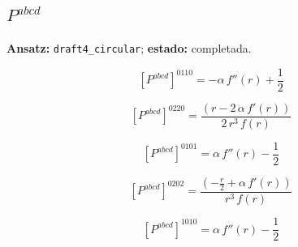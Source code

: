 \documentclass[11pt]{article}
\begin{document}
\subsection*{$ P^{abcd} $}
\textbf{Ansatz:} \texttt{draft4\_circular}; \textbf{estado:} completada.\par
\begin{dmath*}[breakdepth={5}]
\left[P^{abcd}\right]^{0110} = -\alpha\,f''\!\left(r\right) + \frac{1}{2}
\end{dmath*}
\par\smallskip
\begin{dmath*}[breakdepth={5}]
\left[P^{abcd}\right]^{0220} = \frac{\left(r - 2\,\alpha\,f'\!\left(r\right)\right)}{2\,{r}^{3}\,f\!\left(r\right)}
\end{dmath*}
\par\smallskip
\begin{dmath*}[breakdepth={5}]
\left[P^{abcd}\right]^{0101} = \alpha\,f''\!\left(r\right) - \frac{1}{2}
\end{dmath*}
\par\smallskip
\begin{dmath*}[breakdepth={5}]
\left[P^{abcd}\right]^{0202} = \frac{\left(-\frac{r}{2} + \alpha\,f'\!\left(r\right)\right)}{{r}^{3}\,f\!\left(r\right)}
\end{dmath*}
\par\smallskip
\begin{dmath*}[breakdepth={5}]
\left[P^{abcd}\right]^{1010} = \alpha\,f''\!\left(r\right) - \frac{1}{2}
\end{dmath*}
\par\smallskip
\end{document}
